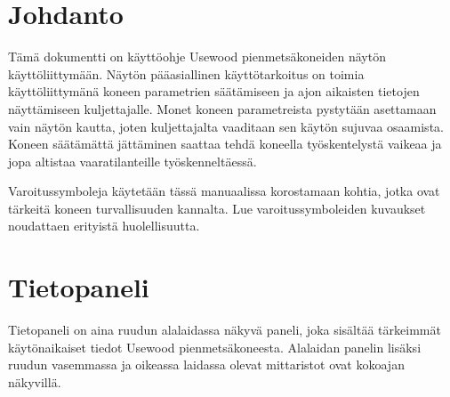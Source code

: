 \documentclass[12pt,a4paper,finnish]{uvmanual}
\begin{document}





\renewcommand\contentsname{Sisällysluettelo}         %
\setcounter{tocdepth}{2}                      %
\tableofcontents                              %

\cleardoublepage

\newpage             %
\setcounter{page}{1} %
\renewcommand{\chaptername}{} %

\chapter{Johdanto}

Tämä dokumentti on käyttöohje Usewood pienmetsäkoneiden näytön käyttöliittymään. Näytön pääasiallinen käyttötarkoitus on toimia käyttöliittymänä koneen parametrien säätämiseen ja ajon aikaisten tietojen näyttämiseen kuljettajalle. Monet koneen parametreista pystytään asettamaan vain näytön kautta, joten kuljettajalta vaaditaan sen käytön sujuvaa osaamista. Koneen säätämättä jättäminen saattaa tehdä koneella työskentelystä vaikeaa ja jopa altistaa vaaratilanteille työskenneltäessä.

{Varoitussymboleja käytetään tässä manuaalissa korostamaan kohtia, jotka ovat tärkeitä koneen turvallisuuden kannalta. Lue varoitussymboleiden kuvaukset noudattaen erityistä huolellisuutta.}

\chapter{Tietopaneli}\label{ch:taskbar}
Tietopaneli on aina ruudun alalaidassa näkyvä paneli, joka sisältää tärkeimmät käytönaikaiset tiedot Usewood pienmetsäkoneesta. Alalaidan panelin lisäksi ruudun vasemmassa ja oikeassa laidassa olevat mittaristot ovat kokoajan näkyvillä.
\end{document}
